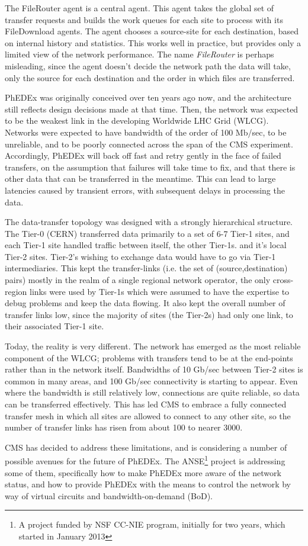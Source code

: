The FileRouter agent is a central agent. This agent takes the global set of transfer requests and builds the work queues for each site to process with its FileDownload agents. The agent chooses a source-site for each destination, based on internal history and statistics. This works well in practice, but provides only a limited view of the network performance. The name \emph{FileRouter} is perhaps misleading, since the agent doesn't decide the network path the data will take, only the source for each destination and the order in which files are transferred.

PhEDEx was originally conceived over ten years ago now, and the architecture still reflects design decisions made at that time. Then, the network was expected to be the weakest link in the developing Worldwide LHC Grid (WLCG)\cite{WLCG}. Networks were expected to have bandwidth of the order of 100 Mb/sec, to be unreliable, and to be poorly connected across the span of the CMS experiment. Accordingly, PhEDEx will back off fast and retry gently in the face of failed transfers, on the assumption that failures will take time to fix, and that there is other data that can be transferred in the meantime. This can lead to large latencies caused by transient errors, with subsequent delays in processing the data.

The data-transfer topology was designed with a strongly hierarchical structure. The Tier-0 (CERN) transferred data primarily to a set of 6-7 Tier-1 sites, and each Tier-1 site handled traffic between itself, the other Tier-1s. and it's local Tier-2 sites. Tier-2's wishing to exchange data would have to go via Tier-1 intermediaries. This kept the transfer-links (i.e. the set of (source,destination) pairs) mostly in the realm of a single regional network operator, the only cross-region links were used by Tier-1s which were assumed to have the expertise to debug problems and keep the data flowing. It also kept the overall number of transfer links low, since the majority of sites (the Tier-2s) had only one link, to their associated Tier-1 site.

Today, the reality is very different. The network has emerged as the most reliable component of the WLCG; problems with transfers tend to be at the end-points rather than in the network itself. Bandwidths of 10 Gb/sec between Tier-2 sites is common in many areas, and 100 Gb/sec connectivity is starting to appear. Even where the bandwidth is still relatively low, connections are quite reliable, so data can be transferred effectively. This has led CMS to embrace a fully connected transfer mesh in which all sites are allowed to connect to any other site, so the number of transfer links has risen from about 100 to nearer 3000.

CMS has decided to address these limitations, and is considering a number of possible avenues for the future of PhEDEx\cite{TW_DB_CHEP13}. The ANSE\footnote{A project funded by NSF CC-NIE program, initially for two years, which started in January 2013}\cite{ANSE} project is addressing some of them, specifically how to make PhEDEx more aware of the network status, and how to provide PhEDEx with the means to control the network by way of virtual circuits and bandwidth-on-demand (BoD).